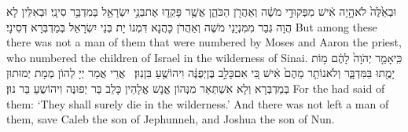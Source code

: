 {וּבְאֵ֙לֶּה֙ לֹא\maqqaf הָ֣יָה אִ֔ישׁ מִפְּקוּדֵ֣י מֹשֶׁ֔ה וְאַהֲרֹ֖ן הַכֹּהֵ֑ן אֲשֶׁ֥ר פָּקְד֛וּ אֶת\maqqaf בְּנֵ֥י יִשְׂרָאֵ֖ל בְּמִדְבַּ֥ר סִינָֽי׃}
{וּבְאִלֵּין לָא הֲוָה גְּבַר מִמִּנְיָנֵי מֹשֶׁה וְאַהֲרֹן כָּהֲנָא דִּמְנוֹ יָת בְּנֵי יִשְׂרָאֵל בְּמַדְבְּרָא דְּסִינָי׃}
{But among these there was not a man of them that were numbered by Moses and Aaron the priest, who numbered the children of Israel in the wilderness of Sinai.}{}
{כִּֽי\maqqaf אָמַ֤ר יְהֹוָה֙ לָהֶ֔ם מ֥וֹת יָמֻ֖תוּ בַּמִּדְבָּ֑ר וְלֹא\maqqaf נוֹתַ֤ר מֵהֶם֙ אִ֔ישׁ כִּ֚י אִם\maqqaf כָּלֵ֣ב בֶּן\maqqaf יְפֻנֶּ֔ה וִיהוֹשֻׁ֖עַ בִּן\maqqaf נֽוּן׃ \setuma }
{אֲרֵי אֲמַר יְיָ לְהוֹן מְמָת יְמוּתוּן בְּמַדְבְּרָא וְלָא אִשְׁתְּאַר מִנְּהוֹן אֱנָשׁ אֱלָהֵין כָּלֵב בַּר יְפוּנֶּה וִיהוֹשֻעַ בַּר נוּן׃}
{For the \lord\space had said of them: ‘They shall surely die in the wilderness.’ And there was not left a man of them, save Caleb the son of Jephunneh, and Joshua the son of Nun.}{}

